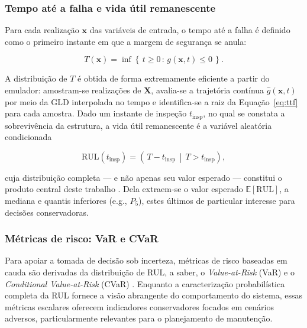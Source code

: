 \subsubsection{Tempo at\'e a falha e vida \'util remanescente}
\label{subsec:ttf_rul}

Para cada realização $\mathbf{x}$ das variáveis de entrada, o tempo até a falha é definido como o primeiro instante em que a margem de segurança se anula:

\begin{equation}
T(\mathbf{x}) = \inf\left\{\, t \geq 0 \,:\, g(\mathbf{x}, t) \leq 0 \,\right\}.
\label{eq:ttf}
\end{equation}

A distribuição de $T$ é obtida de forma extremamente eficiente a partir do emulador: amostram-se realizações de $\mathbf{X}$, avalia-se a trajetória contínua $\hat{g}(\mathbf{x}, t)$ por meio da GLD interpolada no tempo e identifica-se a raiz da Equação~\eqref{eq:ttf} para cada amostra. Dado um instante de inspeção $t_{\mathrm{insp}}$, no qual se constata a sobrevivência da estrutura, a vida útil remanescente é a variável aleatória condicionada

\begin{equation}
\mathrm{RUL}(t_{\mathrm{insp}}) = \left(\, T - t_{\mathrm{insp}} \,\middle|\, T > t_{\mathrm{insp}} \right),
\label{eq:rul}
\end{equation}

\noindent cuja distribuição completa --- e não apenas seu valor esperado --- constitui o produto central deste trabalho \parencite{si2011}. Dela extraem-se o valor esperado $\mathbb{E}[\mathrm{RUL}]$, a mediana e quantis inferiores (e.g., $P_5$), estes últimos de particular interesse para decisões conservadoras.

\subsubsection{M\'etricas de risco: VaR e CVaR}
\label{subsec:var_cvar}

Para apoiar a tomada de decisão sob incerteza, métricas de risco baseadas em cauda são derivadas da distribuição de RUL, a saber, o \textit{Value-at-Risk} (VaR) e o \textit{Conditional Value-at-Risk} (CVaR) \parencite{rockafellar2000}. Enquanto a caracterização probabilística completa da RUL fornece a visão abrangente do comportamento do sistema, essas métricas escalares oferecem indicadores conservadores focados em cenários adversos, particularmente relevantes para o planejamento de manutenção.

